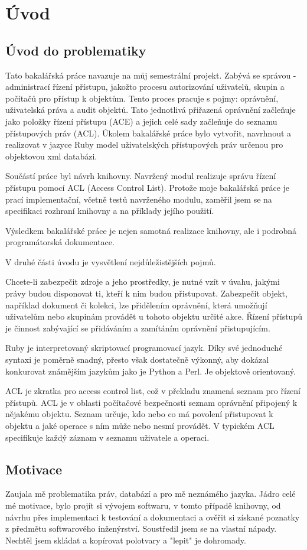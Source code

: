 \chapter{Úvod}

\section{Úvod do problematiky}

Tato bakalářská práce navazuje na můj semestrální projekt. Zabývá se správou - administrací řízení přístupu, jakožto procesu autorizování uživatelů, skupin a počítačů pro přístup k objektům. Tento proces pracuje s pojmy: oprávnění, uživatelská práva a audit objektů. Tato jednotlivá přiřazená oprávnění začleňuje jako položky řízení přístupu (ACE) a jejich celé sady začleňuje do seznamu přístupových práv (ACL). Úkolem bakalářské práce bylo vytvořit, navrhnout a realizovat v jazyce Ruby model uživatelských přístupových práv určenou pro objektovou xml databázi.

Součástí práce byl návrh knihovny. Navržený modul realizuje správu řízení přístupu pomocí ACL (Access Control List). Protože moje bakalářská práce je prací implementační, včetně testů navrženého modulu, zaměřil jsem se na specifikaci rozhraní knihovny a na příklady jejího použití.

Výsledkem bakalářské práce je nejen samotná realizace knihovny, ale i podrobná programátorská dokumentace.

V druhé části úvodu je vysvětlení nejdůležistějších pojmů.

Chcete-li zabezpečit zdroje a jeho prostředky, je nutné vzít v úvahu, jakými právy budou disponovat ti, kteří k nim budou přistupovat. Zabezpečit objekt, například dokument či kolekci, lze přidělením oprávnění, která umožňují uživatelům nebo skupinám provádět u tohoto objektu určité akce. Řízení přístupů je činnost zabývající se přidáváním a zamítáním oprávnění přistupujícím.

Ruby je interpretovaný skriptovací programovací jazyk. Díky své jednoduché syntaxi je poměrně snadný, přesto však dostatečně výkonný, aby dokázal konkurovat známějším jazykům jako je Python a Perl. Je objektově orientovaný.

ACL je zkratka pro access control list, což v překladu znamená seznam pro řízení přístupů. ACL je v oblasti počítačové bezpečnosti seznam oprávnění připojený k nějakému objektu. Seznam určuje, kdo nebo co má povolení přistupovat k objektu a jaké operace s ním může nebo nesmí provádět. V typickém ACL specifikuje každý záznam v seznamu uživatele a operaci.


\section{Motivace}
Zaujala mě problematika práv, databází a pro mě neznámého jazyka.
Jádro celé mé motivace, bylo projít si vývojem softwaru, v tomto případě knihovny, od návrhu přes implementaci k testování a dokumentaci a ověřit si získané poznatky z předmětu softwarového inženýrství. Soustředil jsem se na vlastní nápady. Nechtěl jsem skládat a kopírovat polotvary a "lepit" je dohromady.